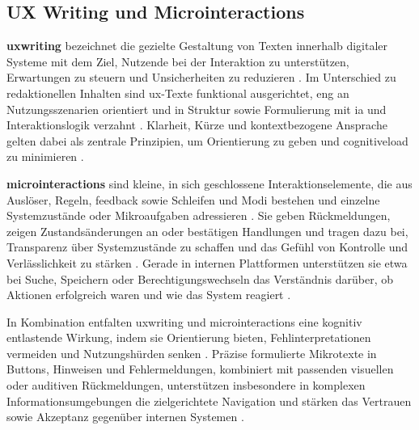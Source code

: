 \subsection{UX Writing und Microinteractions}
\label{subsec:02-02-03_ux-writing-and-microinteractions}

\textbf{\Gls{uxwriting}} bezeichnet die gezielte Gestaltung von Texten innerhalb digitaler Systeme mit dem Ziel, Nutzende bei der Interaktion zu unterstützen, Erwartungen zu steuern und Unsicherheiten zu reduzieren \cite{303:Rosenfeld2015}. Im Unterschied zu redaktionellen Inhalten sind \Gls{ux}-Texte funktional ausgerichtet, eng an Nutzungsszenarien orientiert und in Struktur sowie Formulierung mit \Gls{ia} und Interaktionslogik verzahnt \cite{412:Redish2012}. Klarheit, Kürze und kontextbezogene Ansprache gelten dabei als zentrale Prinzipien, um Orientierung zu geben und \gls{cognitiveload} zu minimieren \cite{412:Redish2012,408:Hassenzahl2010}.

\textbf{\Gls{microinteractions}} sind kleine, in sich geschlossene Interaktionselemente, die aus Auslöser, Regeln, \Gls{feedback} sowie Schleifen und Modi bestehen und einzelne Systemzustände oder Mikroaufgaben adressieren \cite{413:Saffer2014}. Sie geben Rückmeldungen, zeigen Zustandsänderungen an oder bestätigen Handlungen und tragen dazu bei, Transparenz über Systemzustände zu schaffen und das Gefühl von Kontrolle und Verlässlichkeit zu stärken \cite{413:Saffer2014,106:NNGMicrointeractions2018}. Gerade in internen Plattformen unterstützen sie etwa bei Suche, Speichern oder Berechtigungswechseln das Verständnis darüber, ob Aktionen erfolgreich waren und wie das System reagiert \cite{300:FraunhoferIESE2018,413:Saffer2014}.

In Kombination entfalten \Gls{uxwriting} und \Gls{microinteractions} eine kognitiv entlastende Wirkung, indem sie Orientierung bieten, Fehlinterpretationen vermeiden und Nutzungshürden senken \cite{412:Redish2012,105:Sweller1988}. Präzise formulierte Mikrotexte in Buttons, Hinweisen und Fehlermeldungen, kombiniert mit passenden visuellen oder auditiven Rückmeldungen, unterstützen insbesondere in komplexen Informationsumgebungen die zielgerichtete Navigation und stärken das Vertrauen sowie Akzeptanz gegenüber internen Systemen \cite{412:Redish2012,413:Saffer2014,300:FraunhoferIESE2018}.
